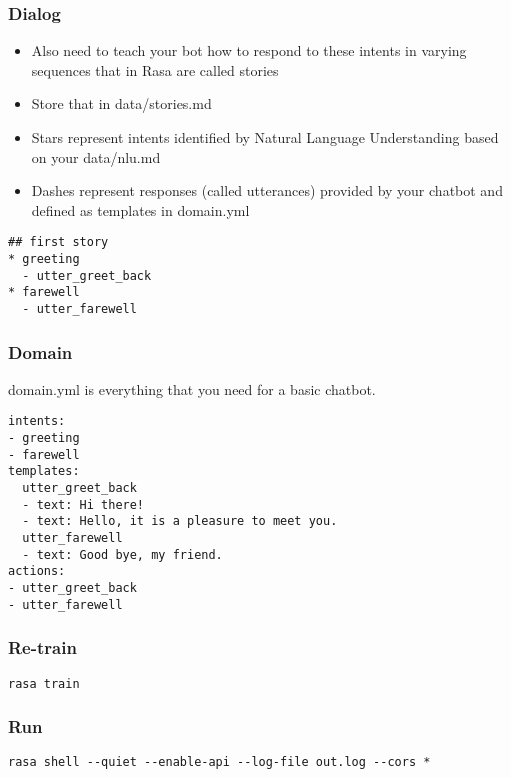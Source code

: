  \begin{frame}[fragile]\frametitle{Dialog}

\begin{itemize}
\item Also need to teach your bot how to respond to these intents in varying sequences that in Rasa are called stories
\item Store that in data/stories.md
\item Stars represent intents identified by Natural Language Understanding based on your data/nlu.md 
\item Dashes represent responses (called utterances) provided by your chatbot and defined as templates in domain.yml
\end{itemize}


\begin{lstlisting}
## first story
* greeting
  - utter_greet_back
* farewell
  - utter_farewell
\end{lstlisting}


\end{frame}

 \begin{frame}[fragile]\frametitle{Domain}

domain.yml is everything that you need for a basic chatbot.

\begin{lstlisting}
intents:
- greeting
- farewell
templates:
  utter_greet_back
  - text: Hi there!
  - text: Hello, it is a pleasure to meet you.
  utter_farewell
  - text: Good bye, my friend.
actions:
- utter_greet_back
- utter_farewell
\end{lstlisting}


\end{frame}

 \begin{frame}[fragile]\frametitle{Re-train}

\begin{lstlisting}
rasa train
\end{lstlisting}


\end{frame}

 \begin{frame}[fragile]\frametitle{Run}

\begin{lstlisting}
rasa shell --quiet --enable-api --log-file out.log --cors *
\end{lstlisting}

\end{frame}

